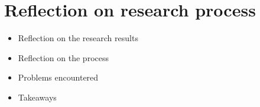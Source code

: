 \chapter*{Reflection on research process} \label{reflection}

\begin{itemize}
    \item Reflection on the research results
    \item Reflection on the process
    \item Problems encountered
    \item Takeaways 
\end{itemize}